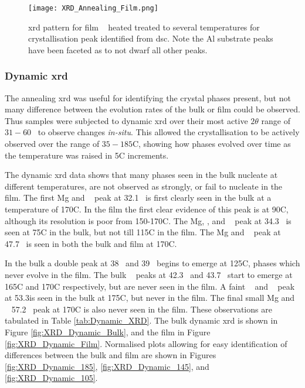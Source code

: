 \documentclass[a4paper,12pt,oneside]{article}%
\begin{document}
\begin{figure}[b]
	\centering
	\texttt{[image: XRD\_Annealing\_Film.png]}
	\caption[Table of contents Capition]{\acrshort{xrd} pattern for film \MgZnCa~ heated treated to several temperatures for crystallisation peak identified from \acrshort{dsc}. Note the Al substrate peaks have been faceted as to not dwarf all other peaks.}
	\label{fig:XRD_Annealing_Film}
\end{figure}

\subsubsection{Dynamic \acrshort{xrd}}

The annealing \acrshort{xrd} was useful for identifying the crystal phases present, but not many difference between the evolution rates of the bulk or film could be observed. Thus samples were subjected to dynamic \acrshort{xrd} over their most active $2 \theta$ range of $31-60$\degree~ to observe changes \textit{in-situ}. This allowed the crystallisation to be actively observed over the range of $35-185$\degree C, showing how phases evolved over time as the temperature was raised in 5\degree C increments. 

The dynamic \acrshort{xrd} data shows that many phases seen in the bulk nucleate at different temperatures, are not observed as strongly, or fail to nucleate in the film. The first Mg and \MgZn~ peak at 32.1\degree~ is first clearly seen in the bulk at a temperature of 170\degree C. In the film the first clear evidence of this peak is at 90\degree C, although its resolution is poor from 150-170\degree C. The Mg, \MgZn, and \CaMgZnFive~ peak at 34.3\degree~ is seen at 75\degree C in the bulk, but not till 115\degree C in the film. The Mg and \MgZn~ peak at 47.7\degree~ is seen in both the bulk and film at 170\degree C. 

In the bulk a double peak at 38\degree~ and 39\degree~ begins to emerge at 125\degree C, phases which never evolve in the film. The bulk \CaMgZnFive~ peaks at 42.3\degree~ and 43.7\degree~ start to emerge at 165\degree C and 170\degree C respectively, but are never seen in the film. A faint \MgZn~ and \CaMgZnFive~ peak at 53.3\degree is seen in the bulk at 175\degree C, but never in the film. The final small Mg and \MgZn~ 57.2\degree~ peak at 170\degree C is also never seen in the film. These observations are tabulated in Table \ref{tab:Dynamic_XRD}. The bulk dynamic \acrshort{xrd} is shown in Figure \ref{fig:XRD_Dynamic_Bulk}, and the film in Figure \ref{fig:XRD_Dynamic_Film}. Normalised plots allowing for easy identification of differences between the bulk and film are shown in Figures \ref{fig:XRD_Dynamic_185}, \ref{fig:XRD_Dynamic_145}, and \ref{fig:XRD_Dynamic_105}.
\end{document}
